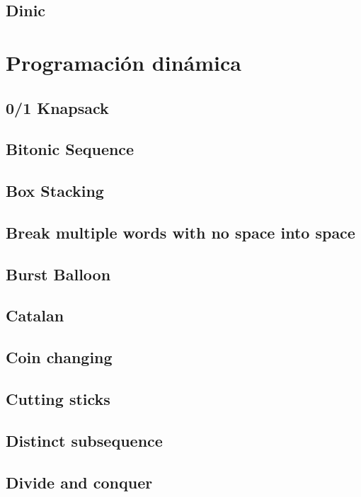 \documentclass[oneside]{book}
\begin{document}
\section{Dinic}
	
	\chapter{Programaci\'on din\'amica}
	\section{0/1 Knapsack}
	
	\section{Bitonic Sequence}
	
	\section{Box Stacking}
	
	\section{Break multiple words with no space into space}
	
	\section{Burst Balloon}
	
	\section{Catalan}
	
	\section{Coin changing}
	
	\section{Cutting sticks}
	
	\section{Distinct subsequence}
	
	\section{Divide and conquer}
	
\end{document}
